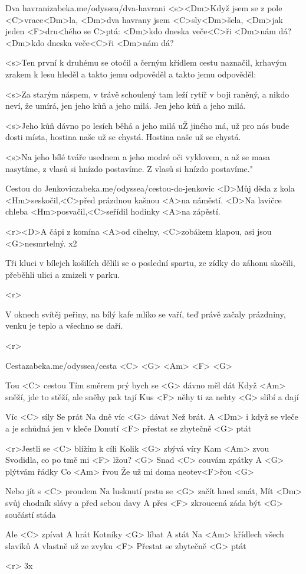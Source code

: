 \begin{song}[Asonance]{10}{Dva havrani}{zabeka.me/odyssea/dva-havrani}
<s><Dm>Když jsem se z pole <C>vrace<Dm>la,
<Dm>dva havrany jsem <C>sly<Dm>šela,
<Dm>jak jeden <F>dru<hého se C>ptá:
<Dm>kdo dneska veče<C>ři <Dm>nám dá?
<Dm>kdo dneska veče<C>ři <Dm>nám dá?

<s>Ten první k druhému se otočil
a černým křídlem cestu naznačil,
krhavým zrakem k lesu hleděl
a takto jemu odpověděl
a takto jemu odpověděl:

<s>Za starým náspem, v trávě schoulený
tam leží rytíř v boji raněný,
a nikdo neví, že umírá,
jen jeho kůň a jeho milá.
Jen jeho kůň a jeho milá.

<s>Jeho kůň dávno po lesích běhá
a jeho milá uŽ jiného má,
už pro nás bude dosti místa,
hostina naše už se chystá.
Hostina naše už se chystá.

<s>Na jeho bílé tváře usednem
a jeho modré oči vyklovem,
a až se masa nasytíme,
z vlasů si hnízdo postavíme.
Z vlasů si hnízdo postavíme." 

\end{song}
\begin{song}[Radůza]{11}{Cestou do Jenkovic}{zabeka.me/odyssea/cestou-do-jenkovic}
<D>Můj děda z kola <Hm>seskočil,<C>před prázdnou kašnou <A>na náměstí.
<D>Na lavičce chleba <Hm>posvačil,<C>seřídil hodinky <A>na zápěstí.

<r><D>A čápi z komína <A>od cihelny, <C>zobákem klapou, asi jsou <G>nesmrtelný. x2

Tři kluci v bílejch košilích dělili se o poslední spartu,
ze zídky do záhonu skočili, přeběhli ulici a zmizeli v parku.

<r> 

V oknech svítěj peřiny, na bílý kafe mlíko se vaří, teď právě začaly prázdniny, venku je teplo a všechno se daří.

<r>
\end{song}
\begin{song}[Kryštof]{12}{Cesta}{zabeka.me/odyssea/cesta}
<C> <G> <Am> <F> <G>

Tou <C> cestou
Tím směrem prý bych se <G> dávno měl dát 
Když <Am> sněží, jde to stěží, ale sněhy pak tají 
Kus <F> něhy ti za nehty <G> slíbí a dají

Víc <C> síly 
Se prát
Na dně víc <G> dávat 
Než brát.
A <Dm> i když se vleče a je schůdná jen v kleče
Donutí <F> přestat se zbytečně <G> ptát

<r>Jestli se <C> blížím k cíli
Kolik <G> zbývá víry
Kam <Am> zvou
Svodidla, co po tmě mi <F> lžou? <G>
Snad <C> couvám zpátky
A <G> plýtvám řádky 
Co <Am> řvou
Že už mi doma neotev<F>řou <G>

Nebo jít s <C> proudem
Na lusknutí prstu se <G> začít hned smát, 
Mít <Dm> svůj chodník slávy a před sebou davy 
A přes <F> zkroucená záda být <G> součástí stáda

Ale <C> zpívat 
A hrát
Kotníky <G> líbat
A stát
Na <Am> křídlech všech slavíků
A vlastně už ze zvyku
<F> Přestat se zbytečně <G> ptát 

<r>
3x
\end{song}
